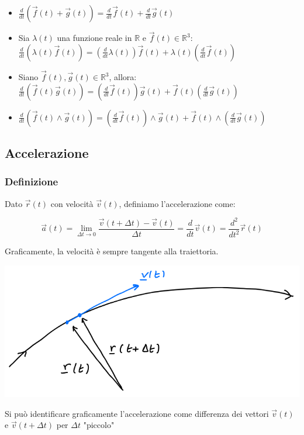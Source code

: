\documentclass{subfiles}
\begin{document}
\begin{itemize}
    \item $\frac{d}{dt}(\vec{f}(t) + \vec{g}(t)) = \frac{d}{dt}\vec{f}(t) + \frac{d}{dt}\vec{g}(t)$
    \item Sia $\lambda(t)$ una funzione reale in $\mathbb{R}$ e $\vec{f}(t) \in \mathbb{R}^3$: $\frac{d}{dt}(\lambda(t)\vec{f}(t)) = (\frac{d}{dt}\lambda(t))\vec{f}(t) + \lambda(t)(\frac{d}{dt}\vec{f}(t))$
    \item Siano $\vec{f}(t), \vec{g}(t) \in \mathbb{R}^3$, allora: $\frac{d}{dt}(\vec{f}(t)\vec{g}(t)) = (\frac{d}{dt}\vec{f}(t))\vec{g}(t) + \vec{f}(t)(\frac{d}{dt}\vec{g}(t))$
    \item $\frac{d}{dt}(\vec{f}(t) \wedge \vec{g}(t)) = (\frac{d}{dt}\vec{f}(t)) \wedge \vec{g}(t) + \vec{f}(t) \wedge (\frac{d}{dt}\vec{g}(t))$
\end{itemize}

\subsection{Accelerazione}

\subsubsection{Definizione}

Dato $\vec{r}(t)$ con velocità $\vec{v}(t)$, definiamo l'accelerazione come:

$$
\vec{a}(t) = \lim_{\Delta t \to 0} \frac{\vec{v}(t + \Delta t) - \vec{v}(t)}{\Delta t} = \frac{d}{dt} \vec{v}(t) = \frac{d^2}{dt^2} \vec{r}(t)
$$

\noindent
Graficamente, la velocità è sempre tangente alla traiettoria.

\includegraphics[width=\columnwidth]{rappresentazione-accelerazione-grafica}

\noindent
Si può identificare graficamente l'accelerazione come differenza dei vettori $\vec{v}(t)$ e $\vec{v}(t + \Delta t)$ per $\Delta t$ "piccolo"
\end{document}
